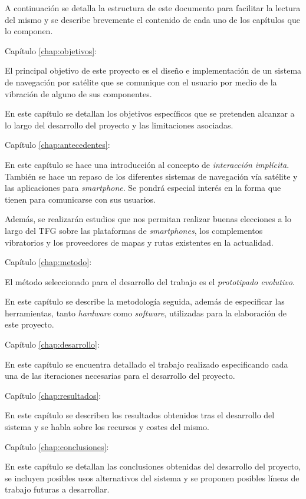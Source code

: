 A continuación se detalla la estructura de este documento para facilitar la lectura del mismo y
se describe brevemente el contenido de cada uno de los capítulos que lo componen.

\begin{definitionlist}
  \item[Capítulo \ref{chap:objetivos}: \nameref{chap:objetivos}] 

  El principal objetivo de este proyecto es el diseño e implementación de un sistema de navegación
  por satélite que se comunique con el usuario por medio de la vibración de alguno de sus
  componentes.

  En este capítulo se detallan los objetivos específicos que se pretenden alcanzar a lo largo
  del desarrollo del proyecto y las limitaciones asociadas.

  \item[Capítulo \ref{chap:antecedentes}: \nameref{chap:antecedentes}]

  En este capítulo se hace una introducción al concepto de \emph{interacción implícita}. También se
  hace un repaso de los diferentes sistemas de navegación vía satélite y las aplicaciones para
  \emph{smartphone}. Se pondrá especial interés en la forma que tienen para comunicarse con sus
  usuarios.

  Además, se realizarán estudios que nos permitan realizar buenas elecciones a lo largo del
  \acs{TFG} sobre las plataformas de \emph{smartphones}, los complementos vibratorios y los
  proveedores de mapas y rutas existentes en la actualidad.

  \item[Capítulo \ref{chap:metodo}: \nameref{chap:metodo}]

  El método seleccionado para el desarrollo del trabajo es el \emph{prototipado evolutivo}.

  En este capítulo se describe la metodología seguida, además de especificar las herramientas, tanto
  \emph{hardware} como \emph{software}, utilizadas para la elaboración de este proyecto.

  \item[Capítulo \ref{chap:desarrollo}: \nameref{chap:desarrollo}]

  En este capítulo se encuentra detallado el trabajo realizado especificando cada una de las
  iteraciones necesarias para el desarrollo del proyecto.

  \item[Capítulo \ref{chap:resultados}: \nameref{chap:resultados}]

  En este capítulo se describen los resultados obtenidos tras el desarrollo del sistema y se habla
  sobre los recursos y costes del mismo.

  \item[Capítulo \ref{chap:conclusiones}: \nameref{chap:conclusiones}]

  En este capítulo se detallan las conclusiones obtenidas del desarrollo del proyecto, se
  incluyen posibles usos alternativos del sistema y se proponen posibles líneas de trabajo
  futuras a desarrollar.

\end{definitionlist}

